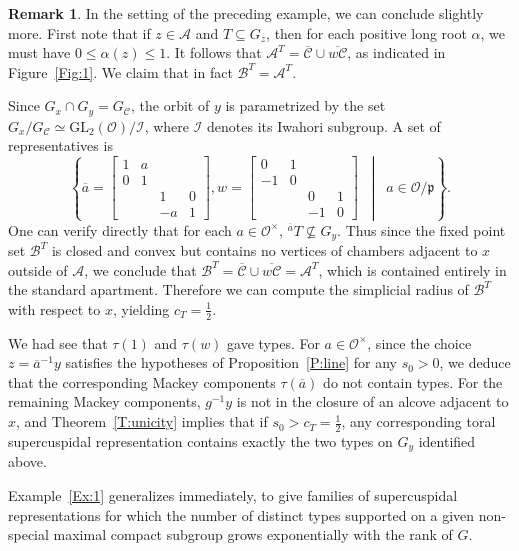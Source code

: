\documentclass[12pt]{amsart}
\newcommand{\R}{{\scriptstyle{\mathcal{O}}}}
\newcommand{\PP}{\mathfrak{p}}
\newcommand{\GL}{\mathrm{GL}}
\newcommand{\apart}{{\mathcal{A}}}
\newcommand{\buil}{\mathcal{B}}
\newcommand{\C}{\mathcal{C}} %
\newcommand{\bmat}[1]{\begin{bmatrix} #1 \end{bmatrix}}
\theoremstyle{plain}
\theoremstyle{definition}
\newtheorem{remark}[theorem]{Remark}
\theoremstyle{remark}
\numberwithin{equation}{section}
\numberwithin{figure}{section}
\begin{document}
\begin{remark}\label{R:ex}
In the setting of the preceding example, we can conclude slightly more.  First note that if $z\in \apart$ and $T\subseteq G_z$, then for each positive long root $\alpha$, we must have $0\leq \alpha(z)\leq 1$.  It follows that $\apart^T = \overline{\C}\cup\overline{w\C}$, as indicated in Figure~\ref{Fig:1}.  We claim that in fact $\buil^T=\apart^T$.

Since $G_x\cap G_y=G_\C$, the orbit of $y$ is parametrized by the set $G_x/G_\C \simeq \GL_2(\R)/\mathcal{I}$, where $\mathcal{I}$ denotes its Iwahori subgroup.  A set of representatives is
$$
\left\{\overline{a} = \bmat{1&a&&\\0&1&& \\ && 1&0\\&&-a&1}, w= \bmat{0&1&&\\-1&0&&\\&&0&1\\&&-1&0} \;\;\middle|  \;\;a \in \R/\PP \right\}.
$$
One can verify directly that for each $a \in \R^\times$, ${}^{\overline{a}} T\not\subseteq G_y$.  Thus since the fixed point set $\buil^T$ is closed and convex but contains no vertices of chambers adjacent to $x$ outside of $\apart$, we conclude that $\buil^T=\overline{\mathcal{C}}\cup \overline{w\mathcal{C}}=\apart^T$, which is contained entirely in the standard apartment.   Therefore we can compute the simplicial radius of $\buil^T$ with respect to $x$, yielding $c_T=\frac12$.  

We had see that $\tau(1)$ and $\tau(w)$ gave types.  For $a\in \R^\times$, since the choice $z=\overline{a}^{-1}y$ satisfies the hypotheses of  Proposition~\ref{P:line} for any $s_0>0$, we deduce that the corresponding Mackey components $\tau(\overline{a})$ do not contain types.  For the remaining Mackey components, $g^{-1}y$ is not in the closure of an alcove adjacent to $x$, and Theorem~\ref{T:unicity} implies that if $s_0>c_T=\frac12$, any corresponding toral supercuspidal representation contains exactly the two types on $G_y$ identified above.
\end{remark}

Example~\ref{Ex:1} generalizes immediately, to give families of supercuspidal representations for which the number of distinct types supported on a given non-special maximal compact subgroup grows exponentially with the rank of $G$.
\end{document}

